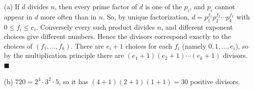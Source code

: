 (a) If $d$ divides $n$, then every prime factor of $d$ is one of the $p_i$, and $p_i$ cannot appear in $d$ more often than in $n$. So, by unique factorization, $d=p_1^{f_1}p_2^{f_2}\cdots p_k^{f_k}$ with $0\le f_i\le e_i$. Conversely every such product divides $n$, and different exponent choices give different numbers. Hence the divisors correspond exactly to the choices of $(f_1,\dots,f_k)$. There are $e_i+1$ choices for each $f_i$ (namely $0,1,\dots,e_i$), so by the multiplication principle there are $(e_1+1)(e_2+1)\cdots(e_k+1)$ divisors. $\blacksquare$

(b) $720=2^4\cdot3^2\cdot5$, so it has $(4+1)(2+1)(1+1)=\boxed{30}$ positive divisors.
